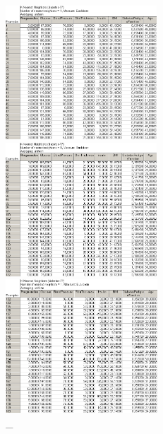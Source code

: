 \begin{figure}[!h]
  \centering

  \begin{minipage}{0.32\textwidth}
    \centering

    \includegraphics[height=5cm]
    {inc/v5_15.PNG}

    \caption{\_}

    \label{fig:14_1}
  \end{minipage}
  \begin{minipage}{0.32\textwidth}
    \centering

    \includegraphics[height=5cm]
    {inc/v5_16.PNG}

    \caption{\_}

    \label{fig:14_2}
  \end{minipage}
  \begin{minipage}{0.32\textwidth}
    \centering

    \includegraphics[height=5cm]
    {inc/v5_17.PNG}

    \caption{\_}

    \label{fig:14_3}
  \end{minipage}
\end{figure}

